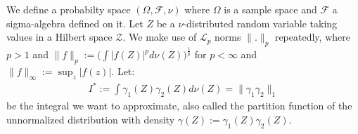 \documentclass{article} %
\newcommand{\Zspace}{\mathcal{Z}}
\newcommand{\f}{f}
\newcommand{\red}[1]{{\color{red}#1}}
\newcommand{\Expectation}[2]{\int{#2}d\nu(\Z)}
\def\Z{Z}
\begin{document}
We define a probabilty space $(\Omega,\mathcal{F}, \nu)$ where $\Omega$ 
is a sample space and $\mathcal{F}$ a sigma-algebra defined on it.
Let $\Z$ be a $\nu$-distributed random variable taking values in a Hilbert space $\Zspace$.
We make use of $\mathcal{L}_p$ norms $\|.\|_p$ repeatedly, where $p>1$ and
$\|\f\|_p:=\bigl(\Expectation{\nu}{|f(\Z)|^p}\bigr)^{\frac 1p}$ for $p<\infty$ and $\|\f\|_\infty:=\sup_z |f(z)|$.
Let: %
\begin{eqnarray}
I^*:=\Expectation{}{\gamma_1(\Z)\gamma_2(\Z)}=\|\gamma_1\gamma_2\|_1
\end{eqnarray}
be the integral we want to approximate, also 
called the partition function of the unnormalized distribution with density $\gamma(\Z) :=\gamma_1(\Z)\gamma_2(\Z)$.

\newcommand{\balpha}{{\bm{\alpha}}}
\end{document}
